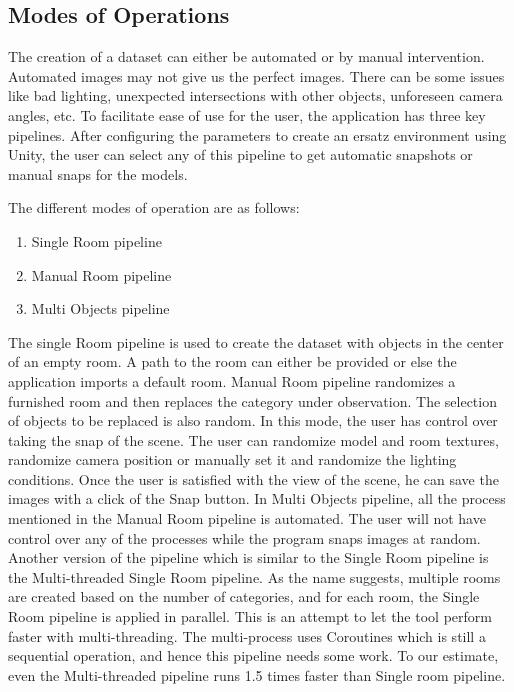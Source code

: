 \subsection{Modes of Operations}\label{subsec:modes-of-operations}
The creation of a dataset can either be automated or by manual intervention.
Automated images may not give us the perfect images.
There can be some issues like bad lighting, unexpected intersections with other objects, unforeseen camera angles, etc.
To facilitate ease of use for the user, the application has three key pipelines.
After configuring the parameters to create an ersatz environment using Unity,
the user can select any of this pipeline to get automatic snapshots or manual snaps for the models.

The different modes of operation are as follows:
\begin{enumerate}
    \item Single Room pipeline
    \item Manual Room pipeline
    \item Multi Objects pipeline
\end{enumerate}

The single Room pipeline is used to create the dataset with objects in the center of an empty room.
A path to the room can either be provided or else the application imports a default room.
Manual Room pipeline randomizes a furnished room and then replaces the category under observation.
The selection of objects to be replaced is also random.
In this mode, the user has control over taking the snap of the scene.
The user can randomize model and room textures, randomize camera position or manually set it and randomize the lighting conditions.
Once the user is satisfied with the view of the scene, he can save the images with a click of the Snap button.
In Multi Objects pipeline, all the process mentioned in the Manual Room pipeline is automated.
The user will not have control over any of the processes while the program snaps images at random.
Another version of the pipeline which is similar to the Single Room pipeline is the Multi-threaded Single Room pipeline.
As the name suggests, multiple rooms are created based on the number of categories, and for each room, the Single Room pipeline is applied in parallel.
This is an attempt to let the tool perform faster with multi-threading.
The multi-process uses Coroutines which is still a sequential operation, and hence this pipeline needs some work.
To our estimate, even the Multi-threaded pipeline runs 1.5 times faster than Single room pipeline.

